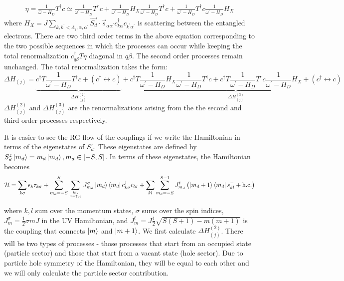 \documentclass[reprint,prb,superscriptaddress]{revtex4-2}
\begin{document}
\begin{widetext}
\begin{equation}\begin{aligned}
	\eta = \frac{1}{\hat \omega - H_D}T^\dagger c \simeq \frac{1}{\omega^\prime - H_D}T^\dagger c + \frac{1}{\omega^\prime - H_D}H_X \frac{1}{\omega^\prime - H_D} T^\dagger c + \frac{1}{\omega^\prime - H_D} T^\dagger c \frac{1}{\omega^\prime - H_D} H_X
\end{aligned}\end{equation}
where \(H_X = J \sum_{k,k^\prime < \Lambda_j, \alpha,\alpha^\prime}\vec{S_d}\cdot\vec{s}_{\alpha \alpha^\prime}c^\dagger_{k\alpha}c_{k^\prime\alpha^\prime}\) is scattering between the entangled electrons. There are two third order terms in the above equation corresponding to the two possible sequences in which the processes can occur while keeping the total renormalization \(c^\dagger_{q\beta}T \eta\) diagonal in \(q\beta\). The second order processes remain unchanged. The total renormalization takes the form:
\begin{equation}
	\label{full_ren}
	\Delta H_{(j)} = \underbrace{c^\dagger T \frac{1}{\omega^\prime - H_D} T^\dagger c  + \left(c^\dagger \leftrightarrow c\right)}_{\Delta H^{(2)}_{(j)}} + \underbrace{c^\dagger T \frac{1}{\omega^\prime - H_D} H_X \frac{1}{\omega^\prime - H_D} T^\dagger c + c^\dagger T \frac{1}{\omega^\prime - H_D} T^\dagger c \frac{1}{\omega^\prime - H_D} H_X + \left(c^\dagger \leftrightarrow c\right)}_{\Delta H^{(3)}_{(j)}}
\end{equation}
\(\Delta H^{(2)}_{(j)}\) and \(\Delta H^{(3)}_{(j)}\) are the renormalizations arising from the the second and third order processes respectively.

It is easier to see the RG flow of the couplings if we write the Hamiltonian in terms of the eigenstates of \(S_d^z\). These eigenstates are defined by \(S_d^z\ket{m_d} = m_d\ket{m_d}, m_d \in \left[-S, S\right]\). In terms of these eigenstates, the Hamiltonian becomes
\begin{equation}\begin{aligned}
	\label{H_spin_S}
	\mathcal{H} = \sum_{k\sigma}\epsilon_{k}\tau_{k\sigma} + \sum_{m_d=-S}^S \sum_{kl,\atop{\sigma=\uparrow,\downarrow}} J^\sigma_{m_d} \ket{m_d}\bra{m_d} c^\dagger_{k \sigma}c_{l \sigma} + \sum_{kl} \sum_{m_d=-S}^{S-1} J^t_{m_d} \left(\ket{m_d+1}\bra{m_d} s^-_{kl}  + \text{h.c.}\right)
\end{aligned}\end{equation}
\end{widetext}
where \(k,l\) sum over the momentum states, \(\sigma\) sums over the spin indices, \(J^\sigma_m = \frac{1}{2} \sigma m J\) in the UV Hamiltonian, and \(J^t_{m} = J\frac{1}{2}\sqrt{S(S+1) - m(m+1)}\) is the coupling that connects \(\ket{m}\) and \(\ket{m+1}\). We first calculate \(\Delta H^{(2)}_{(j)}\). There will be two types of processes - those processes that start from an occupied state (particle sector) and those that start from a vacant state (hole sector). Due to particle hole symmetry of the Hamiltonian, they will be equal to each other and we will only calculate the particle sector contribution. 
\end{document}
